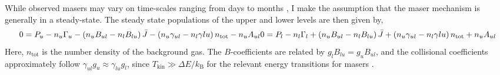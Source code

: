 While observed masers may vary on time-scales ranging from days to months \citep[e.g., ][\S XXX]{Elitzur_1992_review}, I make the assumption that the maser mechanism is generally in a steady-state. The steady state populations of the upper and lower levels are then given by,
\begin{equation}
\label{eq:ss_pops}
0 = P_u - n_u \Gamma_u - \left( n_u B_{ul} - n_l B_{lu} \right)\bar{J} - \left( n_u \gamma_{ul} - n_l \gamma{lu} \right) n_{\mathrm{tot}} - n_u A_{ul} \\
0 = P_l - n_l \Gamma_l + \left( n_u B_{ul} - n_l B_{lu} \right)\bar{J} + \left( n_u \gamma_{ul} - n_l \gamma{lu} \right) n_{\mathrm{tot}} + n_u A_{ul}
\end{equation}
Here, $n_{\mathrm{tot}}$ is the number density of the background gas. The $B$-coefficients are related by $g_lB_{lu}=g_uB_{ul}$, and the collisional coefficients approximately follow $\gamma_{ul}g_u \approx \gamma_{lu}g_l$, since $T_{\mathrm{kin}} \gg \Delta E / k_{\mathrm{B}}$ for the relevant energy transitions for masers \citep{stahler_palla_2004}.

